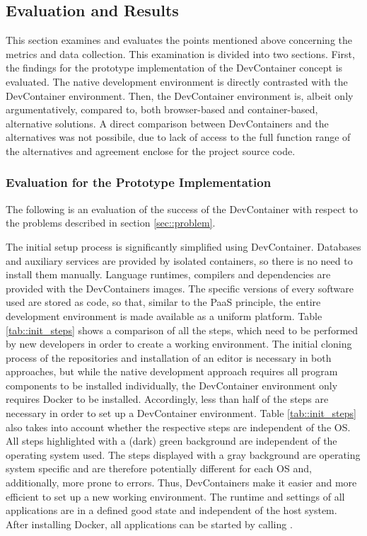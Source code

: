     \subsection{Evaluation and Results}\label{sses::eval_compare}
    This section examines and evaluates the points mentioned above concerning the metrics and data collection. This examination is divided into two sections. First, the findings for the prototype implementation of the DevContainer concept is evaluated. The native development environment is directly contrasted with the DevContainer environment. Then, the DevContainer environment is, albeit only argumentatively, compared to, both browser-based and container-based, alternative solutions. A direct comparison between DevContainers and the alternatives was not possibile, due to lack of access to the full function range of the alternatives and agreement enclose for the project source code.

        \subsubsection{Evaluation for the Prototype Implementation}
        The following is an evaluation of the success of the DevContainer with respect to the problems described in section \ref{sec::problem}.

        The initial setup process is significantly simplified using DevContainer. Databases and auxiliary services are provided by isolated containers, so there is no need to install them manually. Language runtimes, compilers and dependencies are provided with the DevContainers images. The specific versions of every software used are stored as code, so that, similar to the \ac{PaaS} principle, the entire development environment is made available as a uniform platform.\newline
        Table \ref{tab::init_steps} shows a comparison of all the steps, which need to be performed by new developers in order to create a working environment. The initial cloning process of the repositories and installation of an editor is necessary in both approaches, but while the native development approach requires all program components to be installed individually, the DevContainer environment only requires Docker to be installed. Accordingly, less than half of the steps are necessary in order to set up a DevContainer environment. Table \ref{tab::init_steps} also takes into account whether the respective steps are independent of the \acl{OS}. All steps highlighted with a (dark) green background are independent of the operating system used. The steps displayed with a gray background are operating system specific and are therefore potentially different for each \ac{OS} and, additionally, more prone to errors.\newline
        Thus, DevContainers make it easier and more efficient to set up a new working environment. The runtime and settings of all applications are in a defined good state and independent of the host system. After installing Docker, all applications can be started by calling .
        

